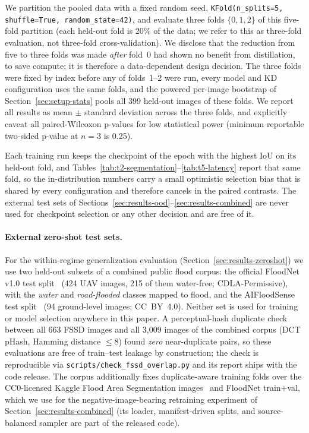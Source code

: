 We partition the pooled data with a fixed random seed, \texttt{KFold(n\_splits=5, shuffle=True, random\_state=42)}, and evaluate three folds $\{0,1,2\}$ of this five-fold partition (each held-out fold is 20\% of the data; we refer to this as three-fold evaluation, not three-fold cross-validation). We disclose that the reduction from five to three folds was made \emph{after} fold~0 had shown no benefit from distillation, to save compute; it is therefore a data-dependent design decision. The three folds were fixed by index before any of folds~1--2 were run, every model and KD configuration uses the same folds, and the powered per-image bootstrap of Section~\ref{sec:setup-stats} pools all 399 held-out images of these folds. We report all results as mean $\pm$ standard deviation across the three folds, and explicitly caveat all paired-Wilcoxon p-values for low statistical power (minimum reportable two-sided p-value at $n=3$ is 0.25).

Each training run keeps the checkpoint of the epoch with the highest IoU on its held-out fold, and Tables~\ref{tab:t2-segmentation}--\ref{tab:t5-latency} report that same fold, so the in-distribution numbers carry a small optimistic selection bias that is shared by every configuration and therefore cancels in the paired contrasts. The external test sets of Sections~\ref{sec:results-ood}--\ref{sec:results-combined} are never used for checkpoint selection or any other decision and are free of it.

\paragraph{External zero-shot test sets.} For the within-regime generalization evaluation (Section~\ref{sec:results-zeroshot}) we use two held-out subsets of a combined public flood corpus: the official FloodNet v1.0 test split~\cite{rahnemoonfar2021floodnet} (424 UAV images, 215 of them water-free; CDLA-Permissive), with the \emph{water} and \emph{road-flooded} classes mapped to flood, and the AIFloodSense test split~\cite{simantiris2026aifloodsense} (94 ground-level images; CC~BY~4.0). Neither set is used for training or model selection anywhere in this paper. A perceptual-hash duplicate check between all 663 FSSD images and all 3{,}009 images of the combined corpus (DCT pHash, Hamming distance $\leq 8$) found \emph{zero} near-duplicate pairs, so these evaluations are free of train--test leakage by construction; the check is reproducible via \texttt{scripts/check\_fssd\_overlap.py} and its report ships with the code release. The corpus additionally fixes duplicate-aware training folds over the CC0-licensed Kaggle Flood Area Segmentation images~\cite{karim2022floodarea} and FloodNet train$+$val, which we use for the negative-image-bearing retraining experiment of Section~\ref{sec:results-combined} (its loader, manifest-driven splits, and source-balanced sampler are part of the released code).

